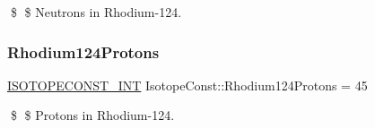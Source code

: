 \$ \$ Neutrons in Rhodium-\/124. \mbox{\label{group___isotope_const-_rhodium-_rh124_gad2882d2e83069a9f4a50861883943890}} 
\subsubsection{\texorpdfstring{Rhodium124\+Protons}{Rhodium124Protons}}
{\footnotesize\ttfamily \mbox{\hyperlink{group___isotope_const-_macros_ga5f18360b3e99483a35c32d789e62621c}{I\+S\+O\+T\+O\+P\+E\+C\+O\+N\+S\+T\+\_\+\+I\+NT}} Isotope\+Const\+::\+Rhodium124\+Protons = 45}

\$ \$ Protons in Rhodium-\/124. 